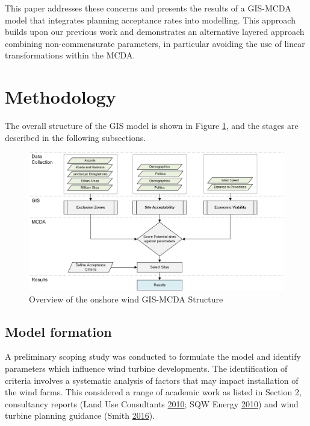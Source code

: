 \documentclass[a4paper,]{article}
\theoremstyle{definition}
\theoremstyle{definition}
\theoremstyle{remark}
\begin{document}
{This paper addresses these concerns and presents the results of a
GIS-MCDA model that integrates planning acceptance rates into modelling.
This approach builds upon our previous work and demonstrates an
alternative layered approach combining non-commensurate parameters, in
particular avoiding the use of linear transformations within the MCDA.

\section{Methodology}\label{methodology}

The overall structure of the GIS model is shown in Figure
\ref{fig:Methodology}, and the stages are described in the following
subsections.

\begin{figure}[!h]
\includegraphics[width=1\linewidth]{figures/Flowchart for GIS Model} \caption{Overview of the onshore wind GIS-MCDA Structure}\label{fig:Methodology}
\end{figure}

\subsection{Model formation}\label{model-formation}

A preliminary scoping study was conducted to formulate the model and
identify parameters which influence wind turbine developments. The
identification of criteria involves a systematic analysis of factors
that may impact installation of the wind farms. This considered a range
of academic work as listed in Section 2, consultancy reports (Land Use
Consultants \protect\hyperlink{ref-LandUseConsultants2010}{2010}; SQW
Energy \protect\hyperlink{ref-SQWEnergy2010}{2010}) and wind turbine
planning guidance (Smith \protect\hyperlink{ref-Smith2016}{2016}).

}
\end{document}
